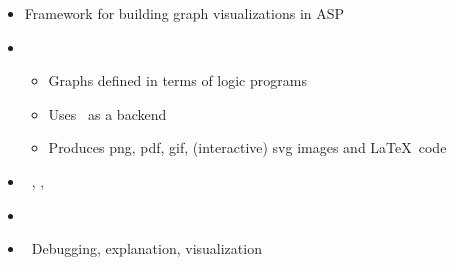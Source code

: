 \begin{frame}{\clingraph}
  \begin{itemize}
    \item {} Framework for building graph visualizations in ASP
    \item {}
      \begin{itemize}
      \item Graphs defined in terms of logic programs %
      \item Uses \graphviz\ as a backend
      \item Produces png, pdf, gif, (interactive) svg images and \LaTeX\ code
      \end{itemize}
    \item {}   \ \clingo, \clorm, \graphviz
    \item {}   \ \cite{hasascst22a}
    \item {} \ Debugging, explanation, visualization %
  \end{itemize}
\end{frame}
%
